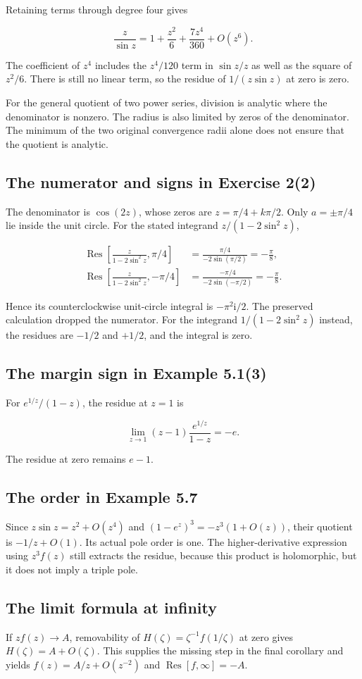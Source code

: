 \documentclass[11pt,a4paper]{article}
\theoremstyle{definition}
\theoremstyle{plain}
\begin{document}
Retaining terms through degree four gives

\[
\frac z{\sin z}=1+\frac{z^2}{6}+\frac{7z^4}{360}+O(z^6).
\]

The coefficient of $z^4$ includes the $z^4/120$ term in $\sin z/z$ as well as the square of $z^2/6$. There is still no linear term, so the residue of $1/(z\sin z)$ at zero is zero.

For the general quotient of two power series, division is analytic where the denominator is nonzero. The radius is also limited by zeros of the denominator. The minimum of the two original convergence radii alone does not ensure that the quotient is analytic.

\subsection{The numerator and signs in Exercise 2(2)}

The denominator is $\cos(2z)$, whose zeros are $z=\pi/4+k\pi/2$. Only $a=\pm\pi/4$ lie inside the unit circle. For the stated integrand $z/(1-2\sin^2z)$,

\[
\begin{aligned}
\operatorname{Res}\left[\frac z{1-2\sin^2z},\pi/4\right]
&=\frac{\pi/4}{-2\sin(\pi/2)}=-\frac\pi8,\\
\operatorname{Res}\left[\frac z{1-2\sin^2z},-\pi/4\right]
&=\frac{-\pi/4}{-2\sin(-\pi/2)}=-\frac\pi8.
\end{aligned}
\]

Hence its counterclockwise unit-circle integral is $-\pi^2\mathrm{i}/2$. The preserved calculation dropped the numerator. For the integrand $1/(1-2\sin^2z)$ instead, the residues are $-1/2$ and $+1/2$, and the integral is zero.

\subsection{The margin sign in Example 5.1(3)}

For $e^{1/z}/(1-z)$, the residue at $z=1$ is

\[
\lim_{z\to1}(z-1)\frac{e^{1/z}}{1-z}=-e.
\]

The residue at zero remains $e-1$.

\subsection{The order in Example 5.7}

Since $z\sin z=z^2+O(z^4)$ and $(1-e^z)^3=-z^3(1+O(z))$, their quotient is $-1/z+O(1)$. Its actual pole order is one. The higher-derivative expression using $z^3f(z)$ still extracts the residue, because this product is holomorphic, but it does not imply a triple pole.

\subsection{The limit formula at infinity}

If $zf(z)\to A$, removability of $H(\zeta)=\zeta^{-1}f(1/\zeta)$ at zero gives $H(\zeta)=A+O(\zeta)$. This supplies the missing step in the final corollary and yields $f(z)=A/z+O(z^{-2})$ and $\operatorname{Res}[f,\infty]=-A$.
\end{document}
